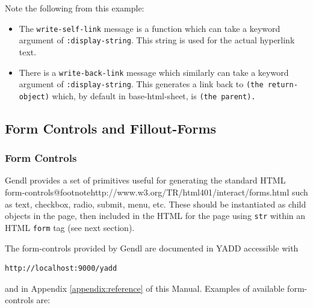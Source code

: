 \documentclass [11pt]{book}
\begin{document}
 Note the following from this example:

\begin{itemize}

\item The \texttt{write-self-link} message is a function which can take a keyword argument
   of \texttt{:display-string}. This string is used for the actual hyperlink text.

\item There is a \texttt{write-back-link} message which similarly can take a keyword argument of \texttt{:display-string}. This generates a link back to \texttt{(the return-object)} which, by default in base-html-sheet, is \texttt{(the parent).}

\end{itemize}





\subsection{Form Controls and Fillout-Forms}

\label{subsec:formcontrolsandfillout-forms}



\subsubsection{Form Controls}

\label{subsubsec:formcontrols}



Gendl provides a set of primitives useful for generating
            the standard HTML
            form-controls@footnote{http://www.w3.org/TR/html401/interact/forms.html}
            such as text, checkbox, radio, submit, menu, etc. These
            should be instantiated as child objects in the page, then
            included in the HTML for the page
            using \texttt{str} within an
            HTML \texttt{form} tag (see next section).



The form-controls provided by Gendl are documented in YADD accessible with 

\begin{verbatim}http://localhost:9000/yadd
\end{verbatim} and in Appendix 
\ref{appendix:reference} of this Manual. Examples of 
available form-controls are:
\end{document}
